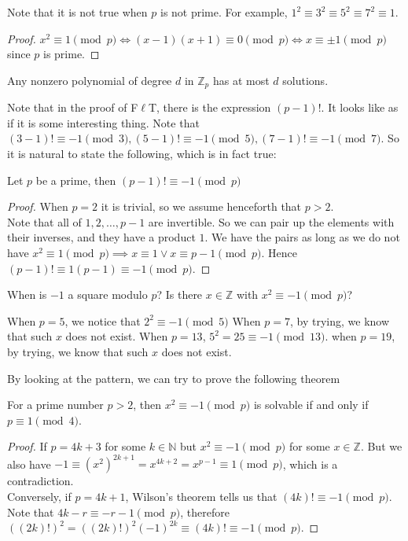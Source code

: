 Note that it is not true when $p$ is not prime.
For example, $1^2\equiv 3^2\equiv 5^2\equiv 7^2\equiv 1$.
\begin{proof}
    $x^2\equiv 1\pmod{p}\iff (x-1)(x+1)\equiv 0\pmod{p}\iff x\equiv\pm 1\pmod{p}$ since $p$ is prime.
\end{proof}
\begin{remark}
    Any nonzero polynomial of degree $d$ in $\mathbb Z_p$ has at most $d$ solutions.
\end{remark}
Note that in the proof of F$\ell$T, there is the expression $(p-1)!$.
It looks like as if it is some interesting thing.
Note that $(3-1)!\equiv -1\pmod{3},(5-1)!\equiv -1\pmod{5},(7-1)!\equiv -1\pmod{7}$.
So it is natural to state the following, which is in fact true:
\begin{theorem}
    Let $p$ be a prime, then $(p-1)!\equiv -1\pmod{p}$
\end{theorem}
\begin{proof}
    When $p=2$ it is trivial, so we assume henceforth that $p>2$.\\
    Note that all of $1,2,\ldots ,p-1$ are invertible.
    So we can pair up the elements with their inverses, and they have a product $1$.
    We have the pairs as long as we do not have $x^2\equiv 1\pmod{p}\implies x\equiv 1\lor x\equiv p-1\pmod{p}$.
    Hence $(p-1)!\equiv 1(p-1)\equiv -1\pmod{p}$.
\end{proof}
When is $-1$ a square modulo $p$?
Is there $x\in\mathbb Z$ with $x^2\equiv -1\pmod{p}$?
\begin{example}
    When $p=5$, we notice that $2^2\equiv -1\pmod{5}$
    When $p=7$, by trying, we know that such $x$ does not exist.
    When $p=13$, $5^2=25\equiv -1\pmod{13}$.
    when $p=19$, by trying, we know that such $x$ does not exist.
\end{example}
By looking at the pattern, we can try to prove the following theorem
\begin{theorem}
    For a prime number $p>2$, then $x^2\equiv -1\pmod{p}$ is solvable if and only if $p\equiv 1\pmod{4}$.
\end{theorem}
\begin{proof}
    If $p=4k+3$ for some $k\in\mathbb N$ but $x^2\equiv -1\pmod{p}$ for some $x\in\mathbb Z$.
    But we also have $-1\equiv (x^2)^{2k+1}=x^{4k+2}=x^{p-1}\equiv 1\pmod{p}$, which is a contradiction.\\
    Conversely, if $p=4k+1$, Wilson's theorem tells us that $(4k)!\equiv -1\pmod{p}$.
    Note that $4k-r\equiv -r-1\pmod{p}$, therefore $((2k)!)^2=((2k)!)^2(-1)^{2k}\equiv (4k)!\equiv -1\pmod{p}$.
\end{proof}
